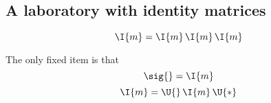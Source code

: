 \subsection{A laboratory with identity matrices}

\begin{equation}
  \I{m} = \I{m}\, \I{m}\, \I{m}
\end{equation}

The only fixed item is that
\begin{equation}
 \sig{} = \I{m}
\end{equation}
\begin{equation}
  \I{m} = \U{}\, \I{m}\, \U{*}
\end{equation}

\endinput
